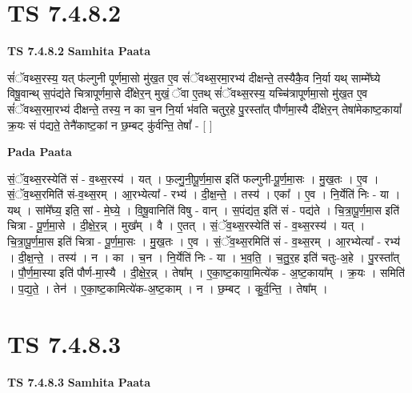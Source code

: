 \documentclass[17pt]{extarticle}
\begin{document}

\section{ TS 7.4.8.2 }

\textbf{TS 7.4.8.2 } \newline
\textbf{Samhita Paata} \newline

सं॑ॅवथ्स॒रस्य॒ यत् फ॑ल्गुनी पूर्णमा॒सो मु॑ख॒त ए॒व सं॑ॅवथ्स॒रमा॒रभ्य॑ दीक्षन्ते॒ तस्यैकै॒व नि॒र्या यथ् साम्मे᳚घ्ये विषू॒वान्थ् स॒पंद्य॑ते चित्रापूर्णमा॒से दी᳚क्षेर॒न् मुखं॒ ॅवा ए॒तथ् सं॑ॅवथ्स॒रस्य॒ यच्चि॑त्रापूर्णमा॒सो मु॑ख॒त ए॒व सं॑ॅवथ्स॒रमा॒रभ्य॑ दीक्षन्ते॒ तस्य॒ न का च॒न नि॒र्या भ॑वति चतुर॒हे पु॒रस्ता᳚त् पौर्णमा॒स्यै दी᳚क्षेर॒न् तेषा॑मेकाष्ट॒कायां᳚ क्र॒यः सं प॑द्यते॒ तेनै॑काष्ट॒कां न छ॒म्बट् कु॑र्वन्ति॒ तेषां᳚ - [  ] \newline

\textbf{Pada Paata} \newline

सं॒ॅव॒थ्स॒रस्येति॑ सं - व॒थ्स॒रस्य॑ । यत् । फ॒ल्गु॒नी॒पू॒र्ण॒मा॒स इति॑ फल्गुनी-पू॒र्ण॒मा॒सः । मु॒ख॒तः । ए॒व । सं॒ॅव॒थ्स॒रमिति॑ सं-व॒थ्स॒रम् । आ॒रभ्येत्या᳚ - रभ्य॑ । दी॒क्ष॒न्ते॒ । तस्य॑ । एका᳚ । ए॒व । नि॒र्येति॑ निः - या । यथ् । सांमे᳚घ्य॒ इति॒ सां - मे॒घ्ये॒ । वि॒षू॒वानिति॑ विषु - वान् । स॒पंद्य॑त॒ इति॑ सं - पद्य॑ते । चि॒त्रा॒पू॒र्ण॒मा॒स इति॑ चित्रा - पू॒र्ण॒मा॒से । दी॒क्षे॒र॒न्न् । मुख᳚म् । वै । ए॒तत् । सं॒ॅव॒थ्स॒रस्येति॑ सं - व॒थ्स॒रस्य॑ । यत् । चि॒त्रा॒पू॒र्ण॒मा॒स इति॑ चित्रा - पू॒र्ण॒मा॒सः । मु॒ख॒तः । ए॒व । सं॒ॅव॒थ्स॒रमिति॑ सं - व॒थ्स॒रम् । आ॒रभ्येत्या᳚ - रभ्य॑ । दी॒क्ष॒न्ते॒ । तस्य॑ । न । का । च॒न । नि॒र्येति॑ निः - या । भ॒व॒ति॒ । च॒तु॒र॒ह इति॑ चतुः-अ॒हे । पु॒रस्ता᳚त् । पौ॒र्ण॒मा॒स्या इति॑ पौर्ण-मा॒स्यै । दी॒क्षे॒र॒न्न् । तेषा᳚म् । ए॒का॒ष्ट॒काया॒मित्ये॑क - अ॒ष्ट॒काया᳚म् । क्र॒यः । समिति॑ । प॒द्य॒ते॒ । तेन॑ । ए॒का॒ष्ट॒कामित्ये॑क-अ॒ष्ट॒काम् । न । छ॒म्बट् । कु॒र्व॒न्ति॒ । तेषा᳚म् ।  \newline





\section{ TS 7.4.8.3 }

\textbf{TS 7.4.8.3 } \newline
\textbf{Samhita Paata} \newline
\end{document}
